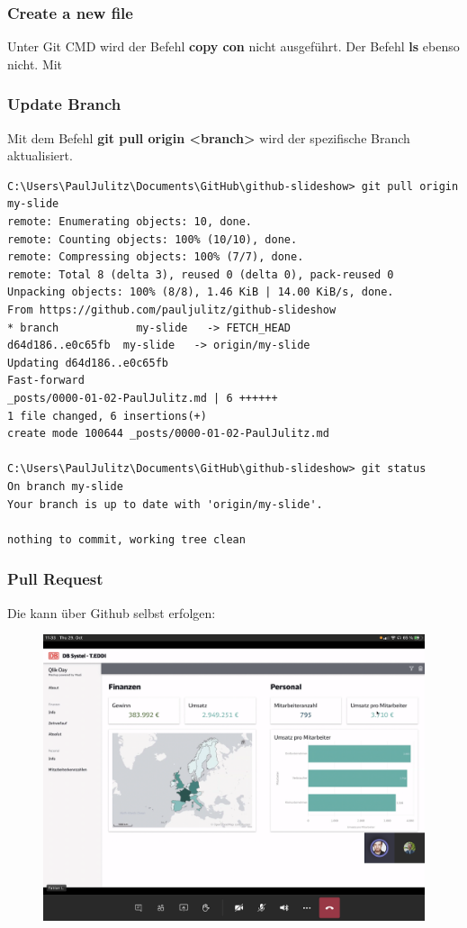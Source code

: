 \subsubsection{Create a new file}
Unter Git CMD wird der Befehl \textbf{copy con} nicht ausgeführt. Der Befehl \textbf{ls} ebenso nicht. Mit  

\subsubsection{Update Branch}
Mit dem Befehl \textbf{git pull origin <branch>} wird der spezifische Branch aktualisiert.
\begin{lstlisting}[style=CMD]
C:\Users\PaulJulitz\Documents\GitHub\github-slideshow> git pull origin my-slide
remote: Enumerating objects: 10, done.
remote: Counting objects: 100% (10/10), done.
remote: Compressing objects: 100% (7/7), done.
remote: Total 8 (delta 3), reused 0 (delta 0), pack-reused 0
Unpacking objects: 100% (8/8), 1.46 KiB | 14.00 KiB/s, done.
From https://github.com/pauljulitz/github-slideshow
* branch            my-slide   -> FETCH_HEAD
d64d186..e0c65fb  my-slide   -> origin/my-slide
Updating d64d186..e0c65fb
Fast-forward
_posts/0000-01-02-PaulJulitz.md | 6 ++++++
1 file changed, 6 insertions(+)
create mode 100644 _posts/0000-01-02-PaulJulitz.md

C:\Users\PaulJulitz\Documents\GitHub\github-slideshow> git status
On branch my-slide
Your branch is up to date with 'origin/my-slide'.

nothing to commit, working tree clean
\end{lstlisting}
\subsubsection{Pull Request}
Die kann über Github selbst erfolgen: 

\begin{figure}[H]
	\centering
	\includegraphics[width=0.7\linewidth]{attachment/chapter_6/Scc006}
\end{figure}

